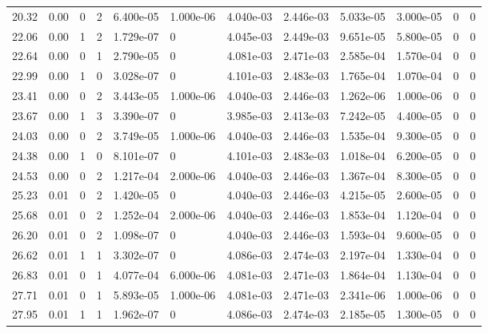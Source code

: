 \documentclass[preview]{standalone}
\begin{document}
{{\begin{tabular}{L{1.2cm}C{1.2cm} C{0.3cm}C{0.5cm} C{1.4cm}C{1.4cm} C{1.4cm}C{1.4cm} C{1.6cm}C{1.6cm} C{1.6cm}C{1.6cm}}
  20.32  &  0.00  & 0     &  2 &  6.400e-05  & 1.000e-06  &  4.040e-03&   2.446e-03& 5.033e-05 & 3.000e-05   &  0 & 0  \\ 
  22.06  &  0.00  & 1     &  2 &  1.729e-07  & 0  &  4.045e-03&   2.449e-03& 9.651e-05 & 5.800e-05   &  0 & 0  \\ 
  22.64  &  0.00  & 0     &  1 &  2.790e-05  & 0  &  4.081e-03&   2.471e-03& 2.585e-04 & 1.570e-04   &  0 & 0  \\ 
  22.99  &  0.00  & 1     &  0 &  3.028e-07  & 0  &  4.101e-03&   2.483e-03& 1.765e-04 & 1.070e-04   &  0 & 0  \\ 
  23.41  &  0.00  & 0     &  2 &  3.443e-05  & 1.000e-06  &  4.040e-03&   2.446e-03& 1.262e-06 & 1.000e-06   &  0 & 0  \\ 
  23.67  &  0.00  & 1     &  3 &  3.390e-07  & 0  &  3.985e-03&   2.413e-03& 7.242e-05 & 4.400e-05   &  0 & 0  \\ 
  24.03  &  0.00  & 0     &  2 &  3.749e-05  & 1.000e-06  &  4.040e-03&   2.446e-03& 1.535e-04 & 9.300e-05   &  0 & 0  \\ 
  24.38  &  0.00  & 1     &  0 &  8.101e-07  & 0  &  4.101e-03&   2.483e-03& 1.018e-04 & 6.200e-05   &  0 & 0  \\ 
  24.53  &  0.00  & 0     &  2 &  1.217e-04  & 2.000e-06  &  4.040e-03&   2.446e-03& 1.367e-04 & 8.300e-05   &  0 & 0  \\ 
  25.23  &  0.01  & 0     &  2 &  1.420e-05  & 0  &  4.040e-03&   2.446e-03& 4.215e-05 & 2.600e-05   &  0 & 0  \\ 
  25.68  &  0.01  & 0     &  2 &  1.252e-04  & 2.000e-06  &  4.040e-03&   2.446e-03& 1.853e-04 & 1.120e-04   &  0 & 0  \\ 
  26.20  &  0.01  & 0     &  2 &  1.098e-07  & 0  &  4.040e-03&   2.446e-03& 1.593e-04 & 9.600e-05   &  0 & 0  \\ 
  26.62  &  0.01  & 1     &  1 &  3.302e-07  & 0  &  4.086e-03&   2.474e-03& 2.197e-04 & 1.330e-04   &  0 & 0  \\ 
  26.83  &  0.01  & 0     &  1 &  4.077e-04  & 6.000e-06  &  4.081e-03&   2.471e-03& 1.864e-04 & 1.130e-04   &  0 & 0  \\ 
  27.71  &  0.01  & 0     &  1 &  5.893e-05  & 1.000e-06  &  4.081e-03&   2.471e-03& 2.341e-06 & 1.000e-06   &  0 & 0  \\ 
  27.95  &  0.01  & 1     &  1 &  1.962e-07  & 0  &  4.086e-03&   2.474e-03& 2.185e-05 & 1.300e-05   &  0 & 0  \\ 
\hline 
\end{tabular} 

}}
\end{document}
